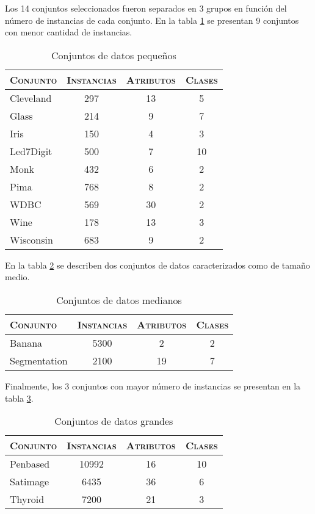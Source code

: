 Los 14 conjuntos seleccionados fueron separados en 3 grupos en función del número de instancias de cada conjunto. En la tabla \ref{data-small} se presentan 9 conjuntos con menor cantidad de instancias.

\begin{table}[h!]
\centering
\begin{tabular}{l c c c}
\hline
\textsc{Conjunto} & \textsc{Instancias} & \textsc{Atributos} & \textsc{Clases} \\
\hline
\hline
Cleveland & 297 & 13 &  5 \\
Glass     & 214 &  9 &  7 \\
Iris      & 150 &  4 &  3 \\
Led7Digit & 500 &  7 & 10 \\
Monk      & 432 &  6 &  2 \\
Pima      & 768 &  8 &  2 \\
WDBC      & 569 & 30 &  2 \\
Wine      & 178 & 13 &  3 \\
Wisconsin & 683 &  9 &  2 \\
\hline
\end{tabular}
\caption{Conjuntos de datos pequeños}
\label{data-small}
\end{table}

En la tabla \ref{data-med} se describen dos conjuntos de datos caracterizados como de tamaño medio.

\begin{table}[h!]
\centering
\begin{tabular}{l c c c}
\hline
\textsc{Conjunto} & \textsc{Instancias} & \textsc{Atributos} & \textsc{Clases} \\
\hline
\hline
Banana       &  5300 &  2 &  2 \\
Segmentation &  2100 & 19 &  7 \\
\hline
\end{tabular}
\caption{Conjuntos de datos medianos}
\label{data-med}
\end{table}

Finalmente, los 3 conjuntos con mayor número de instancias se presentan en la tabla \ref{data-big}.

\begin{table}[h!]
\centering
\begin{tabular}{l c c c}
\hline
\textsc{Conjunto} & \textsc{Instancias} & \textsc{Atributos} & \textsc{Clases} \\
\hline
\hline
Penbased    & 10992 & 16 & 10 \\
Satimage     &  6435 & 36 &  6 \\
Thyroid      &  7200 & 21 &  3 \\
\hline
\end{tabular}
\caption{Conjuntos de datos grandes}
\label{data-big}
\end{table}


